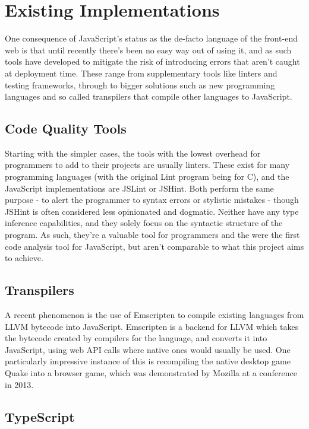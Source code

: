 \documentclass[british, twoside]{bhamthesis}
\theoremstyle{definition}
\begin{document}
  \section{Existing Implementations}
    One consequence of JavaScript's status as the de-facto language of the front-end web is that until recently there's been no easy way out of using it, and as such tools have developed to mitigate the risk of introducing errors that aren't caught at deployment time. These range from supplementary tools like linters and testing frameworks, through to bigger solutions such as new programming languages and so called transpilers that compile other languages to JavaScript.

  \subsection{Code Quality Tools}

    Starting with the simpler cases, the tools with the lowest overhead for programmers to add to their projects are usually linters. These exist for many programming languages (with the original Lint program being for C), and the JavaScript implementations are JSLint or JSHint. Both perform the same purpose - to alert the programmer to syntax errors or stylistic mistakes - though JSHint is often considered less opinionated and dogmatic. Neither have any type inference capabilities, and they solely focus on the syntactic structure of the program. As such, they're a valuable tool for programmers and the were the first code analysis tool for JavaScript, but aren't comparable to what this project aims to achieve.

  \subsection{Transpilers}

    A recent phenomenon is the use of Emscripten\autocite{Zakai} to compile existing languages from LLVM bytecode into JavaScript. Emscripten is a backend for LLVM which takes the bytecode created by compilers for the language, and converts it into JavaScript, using web API calls where native ones would usually be used. One particularly impressive instance of this is recompiling the native desktop game Quake into a browser game, which was demonstrated by Mozilla at a conference in 2013\autocite{unrealengine}.

  \subsection{TypeScript}
\end{document}
